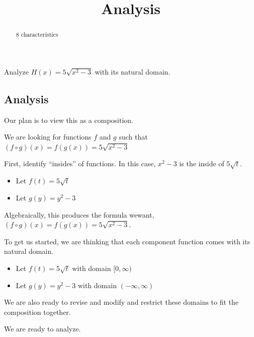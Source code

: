 \documentclass{ximera}
\title{Analysis}
\begin{document}
\begin{abstract}
8 characteristics
\end{abstract}
\maketitle












Analyze $H(x) = 5 \sqrt{x^2-3}$ with its natural domain. 



\subsection*{Analysis}




Our plan is to view this as a composition. 






We are looking for functions $f$ and $g$ such that $(f \circ g)(x) = f(g(x)) = 5 \sqrt{x^2-3}$ 


First, identify ``insides'' of functions.  In this case, $x^2 - 3$ is the inside of $5 \sqrt{t}$. 



\begin{itemize}
\item Let $f(t) = 5 \sqrt{t}$ 
\item Let $g(y) = y^2 - 3$ 
\end{itemize}

Algebraically, this produces the formula wewant, $(f \circ g)(x) = f(g(x)) = 5 \sqrt{x^2-3}$.

To get us started, we are thinking that each component function comes with its natural domain.

\begin{itemize}
\item Let $f(t) = 5 \sqrt{t}$ with domain $[0, \infty)$ 
\item Let $g(y) = y^2 - 3$ with domain $(-\infty, \infty)$ 
\end{itemize}

We are also ready to revise and modify and restrict these domains to fit the composition together. 





We are ready to analyze. 
\end{document}
